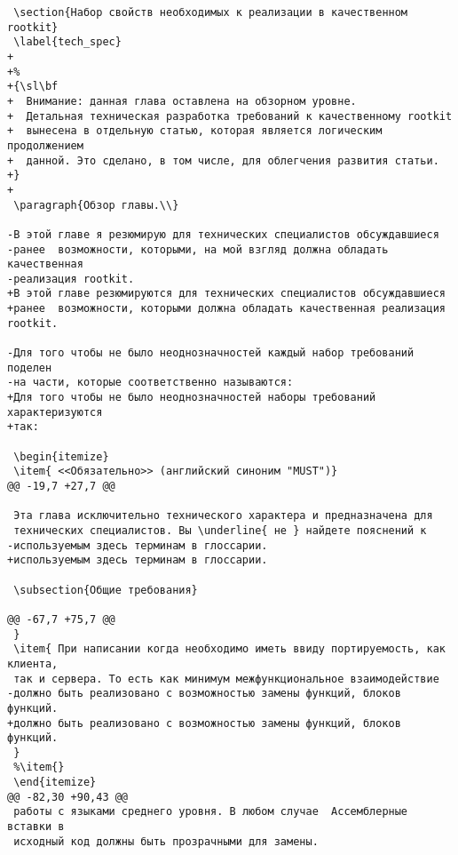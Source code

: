 \begin{verbatim}
 \section{Набор свойств необходимых к реализации в качественном rootkit}
 \label{tech_spec}
+
+%
+{\sl\bf
+  Внимание: данная глава оставлена на обзорном уровне.
+  Детальная техническая разработка требований к качественному rootkit
+  вынесена в отдельную статью, которая является логическим продолжением
+  данной. Это сделано, в том числе, для облегчения развития статьи.
+}
+
 \paragraph{Обзор главы.\\}

-В этой главе я резюмирую для технических специалистов обсуждавшиеся
-ранее  возможности, которыми, на мой взгляд должна обладать качественная
-реализация rootkit.
+В этой главе резюмируются для технических специалистов обсуждавшиеся
+ранее  возможности, которыми должна обладать качественная реализация rootkit.

-Для того чтобы не было неоднозначностей каждый набор требований поделен
-на части, которые соответственно называются:
+Для того чтобы не было неоднозначностей наборы требований характеризуются
+так:

 \begin{itemize}
 \item{ <<Обязательно>> (английский синоним "MUST")}
@@ -19,7 +27,7 @@

 Эта глава исключительно технического характера и предназначена для
 технических специалистов. Вы \underline{ не } найдете пояснений к
-используемым здесь терминам в глоссарии.
+используемым здесь терминам в глоссарии.

 \subsection{Общие требования}

@@ -67,7 +75,7 @@
 }
 \item{ При написании когда необходимо иметь ввиду портируемость, как клиента,
 так и сервера. То есть как минимум межфункциональное взаимодействие
-должно быть реализовано с возможностью замены функций, блоков функций.
+должно быть реализовано с возможностью замены функций, блоков функций.
 }
 %\item{}
 \end{itemize}
@@ -82,30 +90,43 @@
 работы с языками среднего уровня. В любом случае  Ассемблерные вставки в
 исходный код должны быть прозрачными для замены.


\end{verbatim}

